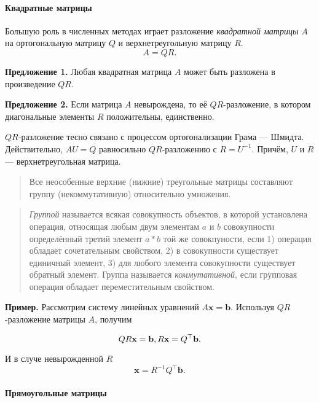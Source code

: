 \documentclass[11pt,a4paper]{article}
\begin{document}
\hypertarget{ux43aux432ux430ux434ux440ux430ux442ux43dux44bux435-ux43cux430ux442ux440ux438ux446ux44b}{%
\paragraph{Квадратные
матрицы}\label{ux43aux432ux430ux434ux440ux430ux442ux43dux44bux435-ux43cux430ux442ux440ux438ux446ux44b}}

Большую роль в численных методах играет разложение \emph{квадратной
матрицы} \(A\) на ортогональную матрицу \(Q\) и верхнетреугольную
матрицу \(R\). \[
  A = QR.
\]

\textbf{Предложение 1.} Любая квадратная матрица \(A\) может быть
разложена в произведение \(QR\).

\textbf{Предложение 2.} Если матрица \(A\) невырождена, то её
\(QR\)-разложение, в котором диагональные элементы \(R\) положительны,
единственно.

\(QR\)-разложение тесно связано с процессом ортогонализации Грама ---
Шмидта. Действительно, \(AU = Q\) равносильно \(QR\)-разложению с
\(R = U^{-1}\). Причём, \(U\) и \(R\) --- верхнетреугольная матрица.

\begin{quote}
Все неособенные верхние (нижние) треугольные матрицы составляют группу
(некоммутативную) относительно умножения.
\end{quote}

\begin{quote}
\emph{Группой} называется всякая совокупность объектов, в которой
установлена операция, относящая любым двум элементам \(a\) и \(b\)
совокупности определённый третий элемент \(a \ast b\) той же
совокпуности, если 1) операция обладает сочетательным свойством, 2) в
совокупности существует единичный элемент, 3) для любого элемента
совокупности существует обратный элемент. Группа называется
\emph{коммутативной}, если групповая операция обладает переместительным
свойством.
\end{quote}

\textbf{Пример.} Рассмотрим систему линейных уравнений
\(A\mathbf{x} = \mathbf{b}\). Используя \(QR\)-разложение матрицы \(A\),
получим

\[
  QR \mathbf{x} = \mathbf{b}, \\
  R \mathbf{x} = Q^\top \mathbf{b}.
\]

И в случе невырожденной \(R\) \[
  \mathbf{x} = R^{-1}Q^\top \mathbf{b}.
\]

    \hypertarget{ux43fux440ux44fux43cux43eux443ux433ux43eux43bux44cux43dux44bux435-ux43cux430ux442ux440ux438ux446ux44b}{%
\paragraph{Прямоугольные
матрицы}\label{ux43fux440ux44fux43cux43eux443ux433ux43eux43bux44cux43dux44bux435-ux43cux430ux442ux440ux438ux446ux44b}}
\end{document}
